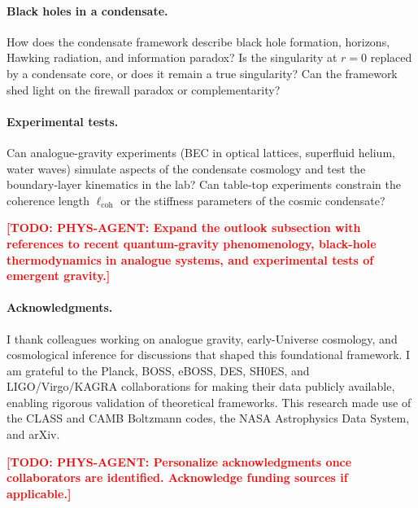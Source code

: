\documentclass[11pt,a4paper]{article}
\theoremstyle{definition}
\newcommand{\TODO}[1]{\textcolor{red}{\textbf{[TODO: #1]}}}
\begin{document}
\paragraph{Black holes in a condensate.}
How does the condensate framework describe black hole formation, horizons, Hawking radiation, and information paradox? Is the singularity at $r = 0$ replaced by a condensate core, or does it remain a true singularity? Can the framework shed light on the firewall paradox or complementarity?

\paragraph{Experimental tests.}
Can analogue-gravity experiments (BEC in optical lattices, superfluid helium, water waves) simulate aspects of the condensate cosmology and test the boundary-layer kinematics in the lab? Can table-top experiments constrain the coherence length $\ell_{\mathrm{coh}}$ or the stiffness parameters of the cosmic condensate?

\TODO{PHYS-AGENT: Expand the outlook subsection with references to recent quantum-gravity phenomenology, black-hole thermodynamics in analogue systems, and experimental tests of emergent gravity.}

\paragraph{Acknowledgments.}
I thank colleagues working on analogue gravity, early-Universe cosmology, and cosmological inference for discussions that shaped this foundational framework. I am grateful to the Planck, BOSS, eBOSS, DES, SH0ES, and LIGO/Virgo/KAGRA collaborations for making their data publicly available, enabling rigorous validation of theoretical frameworks. This research made use of the CLASS and CAMB Boltzmann codes, the NASA Astrophysics Data System, and arXiv.

\TODO{PHYS-AGENT: Personalize acknowledgments once collaborators are identified. Acknowledge funding sources if applicable.}
\end{document}
